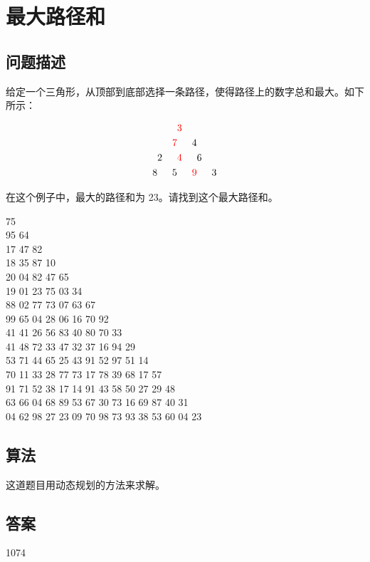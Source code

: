 \section{最大路径和}\label{sec:problem18}
\subsection{问题描述}
\begin{tcolorbox}
	给定一个三角形，从顶部到底部选择一条路径，使得路径上的数字总和最大。如下所示：

	\[
		\begin{aligned}
			  &   &                    & \textcolor{red}{3} &                    &   &   \\
			  &   & \textcolor{red}{7} &                    & 4                  &   &   \\
			  & 2 &                    & \textcolor{red}{4} &                    & 6 &   \\
			8 &   & 5                  &                    & \textcolor{red}{9} &   & 3
		\end{aligned}
	\]

	在这个例子中，最大的路径和为 23。请找到这个最大路径和。

	\begin{center}
		75\\
		95 64\\
		17 47 82\\
		18 35 87 10\\
		20 04 82 47 65\\
		19 01 23 75 03 34\\
		88 02 77 73 07 63 67\\
		99 65 04 28 06 16 70 92\\
		41 41 26 56 83 40 80 70 33\\
		41 48 72 33 47 32 37 16 94 29\\
		53 71 44 65 25 43 91 52 97 51 14\\
		70 11 33 28 77 73 17 78 39 68 17 57\\
		91 71 52 38 17 14 91 43 58 50 27 29 48\\
		63 66 04 68 89 53 67 30 73 16 69 87 40 31\\
		04 62 98 27 23 09 70 98 73 93 38 53 60 04 23\\
	\end{center}
\end{tcolorbox}

\subsection{算法}
这道题目用动态规划的方法来求解。

\subsection{答案}
1074
